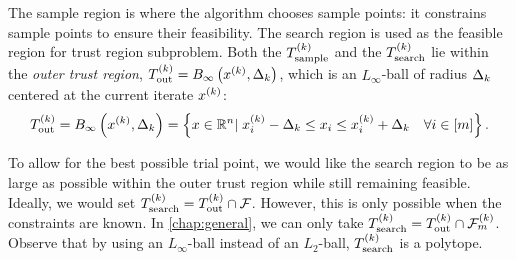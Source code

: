 The sample region is where the algorithm chooses sample points: it constrains sample points to ensure their feasibility.
The search region is used as the feasible region for trust region subproblem.
Both the ${T_{\text{sample}}^{(k)}}$ and the ${T_{\text{search}}^{(k)}}$ lie within the {\em outer trust region}, 
${T_{\text{out}}^{(k)}} = B_{\infty}\left(x^{(k)}, \Delta_k\right)$, which is an $L_{\infty}$-ball of radius $\Delta_k$ centered at the current iterate $x^{(k)}$:
\begin{align}
\label{define_outer_trust_region}
{T_{\text{out}}^{(k)}} = B_{\infty}\left(x^{(k)},\Delta_k\right) = \left\{x\in \mathbb R^n | \; x_i^{(k)} - \Delta_k \le x_i \le x_i^{(k)} + \Delta_k \quad \forall i \in [m] \right \}.
\end{align}

To allow for the best possible trial point, we would like the search region to be as large as possible within the outer trust region while still remaining feasible.
Ideally, we would set ${T_{\text{search}}^{(k)}}={T_{\text{out}}^{(k)}} \cap {\mathcal F}$.
However, this is only possible when the constraints are known.
In \cref{chap:general}, we can only take ${T_{\text{search}}^{(k)}} = {T_{\text{out}}^{(k)}} \cap {\mathcal F_m^{(k)}}$.
Observe that by using an $L_{\infty}$-ball instead of an $L_2$-ball, ${T_{\text{search}}^{(k)}}$ is a polytope.



% 
% 




